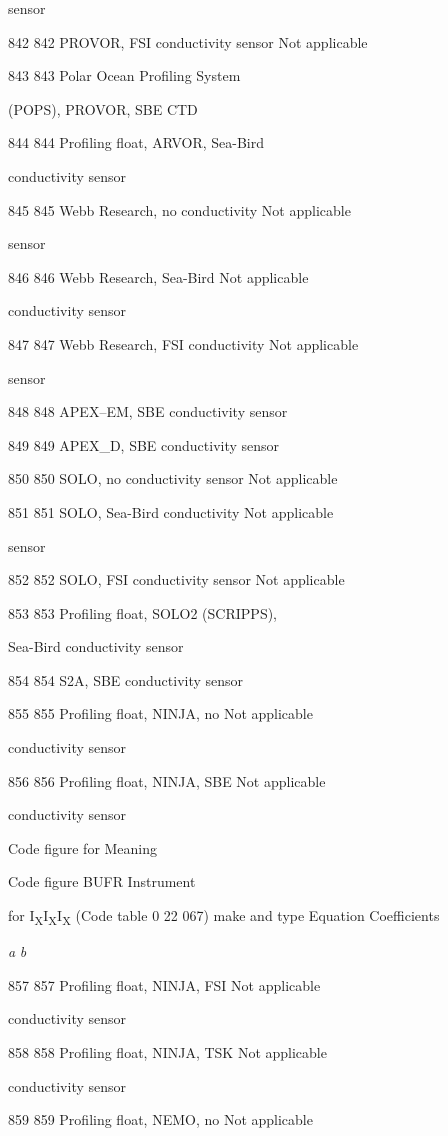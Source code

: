sensor

842 842 PROVOR, FSI conductivity sensor Not applicable

843 843 Polar Ocean Profiling System

(POPS), PROVOR, SBE CTD

844 844 Profiling float, ARVOR, Sea-Bird

conductivity sensor

845 845 Webb Research, no conductivity Not applicable

sensor

846 846 Webb Research, Sea-Bird Not applicable

conductivity sensor

847 847 Webb Research, FSI conductivity Not applicable

sensor

848 848 APEX--EM, SBE conductivity sensor

849 849 APEX\_D, SBE conductivity sensor

850 850 SOLO, no conductivity sensor Not applicable

851 851 SOLO, Sea-Bird conductivity Not applicable

sensor

852 852 SOLO, FSI conductivity sensor Not applicable

853 853 Profiling float, SOLO2 (SCRIPPS),

Sea-Bird conductivity sensor

854 854 S2A, SBE conductivity sensor

855 855 Profiling float, NINJA, no Not applicable

conductivity sensor

856 856 Profiling float, NINJA, SBE Not applicable

conductivity sensor

Code figure for Meaning

Code figure BUFR Instrument

for I\textsubscript{X}I\textsubscript{X}I\textsubscript{X} (Code table 0 22 067) make and type Equation Coefficients

\emph{a} \emph{b}

857 857 Profiling float, NINJA, FSI Not applicable

conductivity sensor

858 858 Profiling float, NINJA, TSK Not applicable

conductivity sensor

859 859 Profiling float, NEMO, no Not applicable

